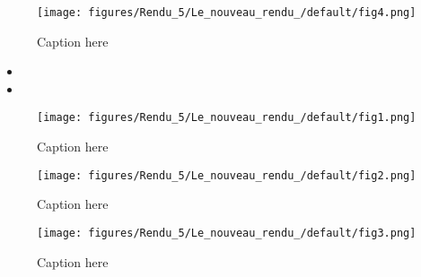 \documentclass{mytex}
\begin{document}
\begin{figure}[h!]
    \centering
    \texttt{[image: figures/Rendu\_5/Le\_nouveau\_rendu\_/default/fig4.png]}
    \caption{Caption here}
    \label{fig:Rendu_5_Le_nouveau_rendu__4}
\end{figure}

\begin{itemize}
	\item
	\item
\end{itemize}



\begin{figure}[h!]
    \centering
    \texttt{[image: figures/Rendu\_5/Le\_nouveau\_rendu\_/default/fig1.png]}
    \caption{Caption here}
    \label{fig:Rendu_5_Le_nouveau_rendu__1}
\end{figure}


\begin{figure}[h!]
    \centering
    \texttt{[image: figures/Rendu\_5/Le\_nouveau\_rendu\_/default/fig2.png]}
    \caption{Caption here}
    \label{fig:Rendu_5_Le_nouveau_rendu__2}
\end{figure}


\begin{figure}[h!]
    \centering
    \texttt{[image: figures/Rendu\_5/Le\_nouveau\_rendu\_/default/fig3.png]}
    \caption{Caption here}
    \label{fig:Rendu_5_Le_nouveau_rendu__3}
\end{figure}

\merci
\end{document}
